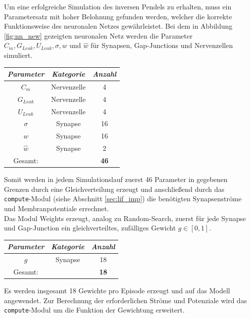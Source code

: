 	Um eine erfolgreiche Simulation des inversen Pendels zu erhalten, muss ein Parametersatz mit hoher Belohnung gefunden werden, welcher die korrekte Funktionsweise des neuronalen Netzes gewährleistet. Bei dem in Abbildung \ref{fig:nn_new} gezeigten neuronalen Netz werden die Parameter $C_m, G_{Leak}, U_{Leak}, \sigma, w$ und $\hat{w}$ für Synapsen, Gap-Junctions und Nervenzellen simuliert.
	\begin{center}
		\begin{tabular}{c@{\hskip 0.5cm}c@{\hskip 0.5cm}c@{\hskip 0.5cm}}    \toprule
			\setlength{\tabcolsep}{50pt}
			\renewcommand{\arraystretch}{1.5}
			\emph{Parameter}	& \emph{Kategorie}  & \emph{Anzahl} \\\midrule
			$C_m$				& Nervenzelle		& 4				\\ 
			$G_{Leak}$	 		& Nervenzelle		& 4				\\
			$U_{Leak}$	 		& Nervenzelle		& 4				\\
			$\sigma$			& Synapse			& 16			\\
			$w$					& Synapse			& 16			\\ 
			$\hat{w}$			& Synapse			& 2				\\\bottomrule
			Gesamt:				&					& \textbf{46}	\\
			\hline
		\end{tabular}
	\end{center}
	Somit werden in jedem Simulationslauf zuerst 46 Parameter in gegebenen Grenzen durch eine Gleichverteilung erzeugt und anschließend durch das \texttt{compute}-Modul (siehe Abschnitt \ref{sec:lif_imp}) die benötigten Synapsenströme und Membranpotentiale errechnet.\\
	Das Modul Weights erzeugt, analog zu Random-Search, zuerst für jede Synapse und Gap-Junction ein gleichverteiltes, zufälliges Gewicht $g\in[0,1]$.
	\begin{center}
		\begin{tabular}{c@{\hskip 0.5cm}c@{\hskip 0.5cm}c@{\hskip 0.5cm}}    \toprule
			\setlength{\tabcolsep}{50pt}
			\renewcommand{\arraystretch}{1.5}
			\emph{Parameter}	& \emph{Kategorie}  & \emph{Anzahl} \\\midrule
			$g$					& Synapse			& 18			\\\bottomrule
			Gesamt:				&					& \textbf{18}	\\
			\hline
		\end{tabular}
	\end{center}
	Es werden insgesamt 18 Gewichte pro Episode erzeugt und auf das Modell angewendet. Zur Berechnung der erforderlichen Ströme und Potenziale wird das \texttt{compute}-Modul um die Funktion der Gewichtung erweitert.
	
